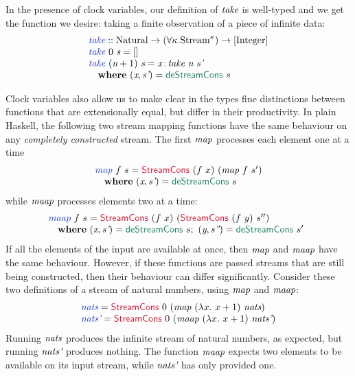 In the presence of clock variables, our definition of $\textit{take}$
is well-typed and we get the function we desire: taking a finite
observation of a piece of infinite data:
\begin{displaymath}
  \begin{array}{l}
    \defn{take} :: \tyname{Natural} \to (\forall \kappa. \tyname{Stream}^\kappa) \to [\tyname{Integer}] \\
    \defn{take}\ 0\ \ident{s} = [] \\
    \defn{take}\ (\ident{n}+1)\ \ident{s} = \ident{x} \mathop{\cons{:}} \ident{take}\ \ident{n}\ \ident{s'} \\
    \quad \kw{where}\ (\ident{x}, \ident{s'}) = \elim{deStreamCons}\ \ident{s}
  \end{array}
\end{displaymath}

Clock variables also allow us to make clear in the types fine
distinctions between functions that are extensionally equal, but
differ in their productivity. In plain Haskell, the following two
stream mapping functions have the same behaviour on any
\emph{completely constructed} stream. The first $\textit{map}$
processes each element one at a time
\begin{displaymath}
  \begin{array}{l}
    \defn{map}~f~s = \cons{StreamCons}~(f~x)~(\ident{map}~f~s') \\
    \quad \kw{where}~(\ident{x}, \ident{s'}) = \elim{deStreamCons}~s
  \end{array}
\end{displaymath}
while $\textit{maap}$ processes elements two at a time:
\begin{displaymath}
  \begin{array}{@{}l}
    \defn{maap}~f~s = \cons{StreamCons}~(f~x)~(\cons{StreamCons}~(f~y)~s'') \\
    \quad \kw{where}~(\ident{x}, \ident{s'}) = \elim{deStreamCons}~s;~(\ident{y}, \ident{s''}) = \elim{deStreamCons}~s'
  \end{array}
\end{displaymath}
If all the elements of the input are available at once, then
$\textit{map}$ and $\textit{maap}$ have the same behaviour. However, if
these functions are passed streams that are still being constructed,
then their behaviour can differ significantly. Consider these two
definitions of a stream of natural numbers, using $\textit{map}$ and $\textit{maap}$:
\begin{displaymath}
  \begin{array}{l}
    \defn{nats} = \cons{StreamCons}~0~(\ident{map}~(\lambda x.~x+1)~\ident{nats})\\
    \defn{nats'} = \cons{StreamCons}~0~(\ident{maap}~(\lambda x.~x+1)~\ident{nats'})
  \end{array}  
\end{displaymath}
Running $\textit{nats}$ produces the infinite stream of natural
numbers, as expected, but running $\textit{nats'}$ produces
nothing. The function $\textit{maap}$ expects two elements to be
available on its input stream, while $\textit{nats'}$ has only provided
one.

